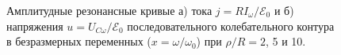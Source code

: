 \begin{figure}[h!]
    \begin{minipage}[h]{0.5\linewidth}
        \centering
    \end{minipage}
    \hfill
    \begin{minipage}[h]{0.5\linewidth}
        \centering
    \end{minipage}
    \caption{Амплитудные резонансные кривые а) тока $j=RI_{\omega}/\mathcal{E}_0$ 
         и б) напряжения $u=U_{C\omega}/\mathcal{E}_0$ 
         последовательного колебательного контура в безразмерных переменных 
         ($x=\omega/\omega_0$) при $\rho/R=2$, 5 и 10.}
\end{figure}

